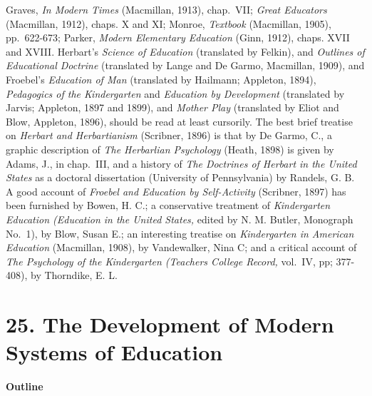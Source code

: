 \documentclass[
]{book}
\begin{document}
Graves, \emph{In Modern Times} (Macmillan, 1913), chap.~VII; \emph{Great Educators} (Macmillan, 1912), chaps. X and XI; Monroe, \emph{Textbook} (Macmillan, 1905), pp.~622-673; Parker, \emph{Modern Elementary Education} (Ginn, 1912), chaps. XVII and XVIII. Herbart's \emph{Science of Education} (translated by Felkin), and \emph{Outlines of Educational Doctrine} (translated by Lange and De Garmo, Macmillan, 1909), and Froebel's \emph{Education of Man} (translated by Hailmann; Appleton, 1894), \emph{Pedagogics of the Kindergarten} and \emph{Education by Development} (translated by Jarvis; Appleton, 1897 and 1899), and \emph{Mother Play} (translated by Eliot and Blow, Appleton, 1896), should be read at least cursorily. The best brief treatise on \emph{Herbart and Herbartianism} (Scribner, 1896) is that by De Garmo, C., a graphic description of \emph{The Herbarlian Psychology} (Heath, 1898) is given by Adams, J., in chap.~III, and a history of \emph{The Doctrines of Herbart in the United States} as a doctoral dissertation (University of Pennsylvania) by Randels, G. B. A good account of \emph{Froebel and Education by Self-Activity} (Scribner, 1897) has been furnished by Bowen, H. C.; a conservative treatment of \emph{Kindergarten Education (Education in the United States,} edited by N. M. Butler, Monograph No.~1), by Blow, Susan E.; an interesting treatise on \emph{Kindergarten in American Education} (Macmillan, 1908), by Vandewalker, Nina C; and a critical account of \emph{The Psychology of the Kindergarten (Teachers College Record,} vol.~IV, pp; 377-408), by Thorndike, E. L.

\hypertarget{the-development-of-modern-systems-of-education}{%
\chapter{25. The Development of Modern Systems of Education}\label{the-development-of-modern-systems-of-education}}

\textbf{Outline}
\end{document}
